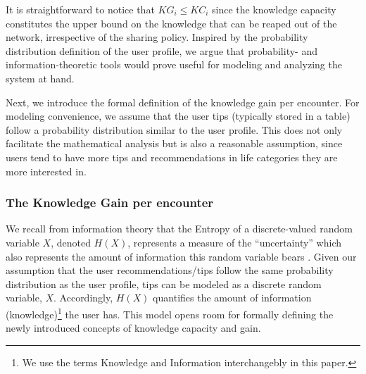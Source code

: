 \documentclass[conference]{IEEEtran}
\theoremstyle{definition}
\begin{document}
It is straightforward to notice that $KG_i \le KC_i$ since the knowledge capacity constitutes the upper bound on the knowledge that can be reaped out of the network, irrespective of the sharing policy. Inspired by the probability distribution definition of the user profile, we argue that probability- and information-theoretic tools would prove useful for modeling and analyzing the system at hand.

Next, we introduce the formal definition of the knowledge gain per encounter. For modeling convenience, we assume that the user tips (typically stored in a table) follow a probability distribution similar to the user profile. This does not only facilitate the mathematical analysis but is also a reasonable assumption, since users tend to have more tips and recommendations in life categories they are more interested in.
%

%
\vspace{-0.3 cm}
\subsubsection{The Knowledge Gain per encounter}
\vspace{-0.2 cm}
We recall from information theory that the Entropy of a discrete-valued random variable $X$, denoted $H(X)$, represents a measure of the ``uncertainty'' which also represents the amount of information this random variable bears \cite{cover}. Given our assumption that the user recommendations/tips follow the same probability distribution as the user profile, tips can be modeled as a discrete random variable, $X$. Accordingly, $H(X)$ 
quantifies the amount of information (knowledge)\footnote{We use the terms Knowledge and Information interchangebly in this paper.} the user has. This model opens room for formally defining the newly introduced concepts of knowledge capacity and gain.
\end{document}
